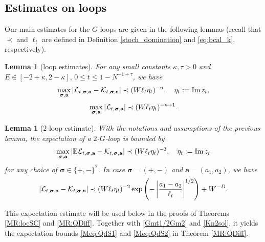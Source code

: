 \documentclass[10pt,reqno]{article}
\DeclareMathOperator{\im}{{\mathrm{Im}}}
\theoremstyle{plain} %
\newtheorem{lemma}[theorem]{Lemma}
\theoremstyle{remark}
\numberwithin{equation}{section}
\begin{document}
\subsection{Estimates on loops}
 

Our main estimates for the $G$-loops are given in the following lemmas (recall that $\prec$ and $\ell_t$ are defined in Definition \ref{stoch_domination} and \eqref{eq:bcal_k}, respectively).

\begin{lemma}[loop estimates]\label{ML:GLoop}
For any small constants $\kappa, \tau>0$ and  
$E \in[-2+\kappa, 2-\kappa], \, 0\le t\le 1-N^{-1+\tau}$,  
we have 
\begin{equation}\label{Eq:L-KGt}
 \max_{\boldsymbol{\sigma}, \textbf{a}}\left|{\cal L}_{t, \boldsymbol{\sigma}, \textbf{a}}-{\cal K}_{t, \boldsymbol{\sigma}, \textbf{a}}\right|\prec (W\ell_t\eta_t)^{-n},\quad \eta_t:=\im z_t,  %
\end{equation}
 \begin{equation}\label{Eq:L-KGt2}
\max_{\boldsymbol{\sigma}, \textbf{a}}\left|{\cal L}_{t, \boldsymbol{\sigma}, \textbf{a}} \right|\prec (W\ell_t\eta_t)^{-n+1}. %
\end{equation}
\end{lemma}

\begin{lemma}[$2$-loop estimate]\label{ML:GLoop_expec}
With the notations and assumptions of the previous lemma, 
the expectation of a $2$-$G$-loop is bounded by  
\begin{equation}\label{Eq:Gtlp_exp}
 \max_{\boldsymbol{\sigma}, \textbf{a}}\left|\mathbb E{\cal L}_{t, \boldsymbol{\sigma}, \textbf{a}}-{\cal K}_{t, \boldsymbol{\sigma}, \textbf{a}}\right|\prec (W\ell_t\eta_t)^{-3}
 ,\quad \eta_t:=\im z_t
\end{equation}
for any choice of  $\boldsymbol{\sigma}\in\{+,-\}^2$.
In case $\boldsymbol{\sigma}=(+,-)$ and $ \textbf{a}=(a_1, a_2)$, 
we have
\begin{equation}\label{Eq:Gdecay}
 \left| {\cal L}_{t, \boldsymbol{\sigma}, \textbf{a}}-{\cal K}_{t, \boldsymbol{\sigma}, \textbf{a}}\right|\prec (W\ell_t\eta_t)^{-2}\exp \left(-\left|\frac{ a_1-a_2 }{\ell_t}\right|^{1/2}\right)+W^{-D}. 
\end{equation}
\end{lemma}
This expectation estimate will be used below in the proofs of Theorems \ref{MR:locSC} and \ref{MR:QDiff}. Together with \eqref{Gmt1/2Gm2} and \eqref{Kn2sol}, it yields the expectation bounds \eqref{Meq:QdS1} and \eqref{Meq:QdS2} in Theorem \ref{MR:QDiff}.
\end{document}
